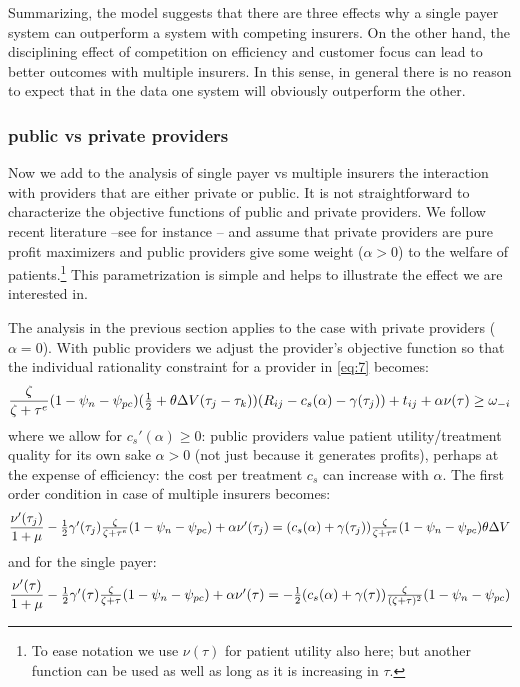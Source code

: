 \documentclass[a4paper,12pt]{article}
\begin{document}
Summarizing, the model suggests that there are three effects why a single payer system can outperform a system with competing insurers. On the other hand, the disciplining effect of competition on efficiency and customer focus can lead to better outcomes with multiple insurers. In this sense, in general there is no reason to expect that in the data one system will obviously outperform the other.

\subsubsection{public vs private providers}
\label{sec:org10bf75f}

Now we add to the analysis of single payer vs multiple insurers the interaction with providers that are either private or public. It is not straightforward to characterize the objective functions of public and private providers. We follow recent literature --see for instance \cite{Brekke2018}-- and assume that private providers are pure profit maximizers and public providers give some weight (\(\alpha > 0\)) to the welfare of patients.\footnote{To ease notation we use \(\nu(\tau)\) for patient utility also here; but another function can be used as well as long as it is increasing in \(\tau\).} This parametrization is simple and helps to illustrate the effect we are interested in.

The analysis in the previous section applies to the case with private providers (\(\alpha=0\)). With public providers we adjust the provider's objective function so that the individual rationality constraint for a provider in \eqref{eq:7} becomes:
\begin{equation}
\label{eq:7a}
\frac{\zeta}{\zeta+\tau^e}(1-\psi_n-\psi_{pc})( \textstyle{1\over 2} + \theta \Delta V (\tau_j - \tau_k))(R_{ij}-c_s(\alpha)-\gamma(\tau_j) ) + t_{ij} + \alpha \nu(\tau) \geq \omega_{-i}
\end{equation}
where we allow for \(c_s'(\alpha) \geq 0\): public providers value patient utility/treatment quality for its own sake \(\alpha>0\) (not just because it generates profits), perhaps at the expense of efficiency: the cost per treatment \(c_s\) can increase with \(\alpha\). The first order condition in case of multiple insurers becomes:
\begin{equation}
\label{eq:37public} 
\frac{\nu'(\tau_j)}{1+\mu} - \textstyle{1\over 2} \gamma'(\tau_j) \frac{\zeta}{\zeta+\tau^e}(1-\psi_n-\psi_{pc}) + \alpha \nu'(\tau_j) = (c_s(\alpha)+\gamma(\tau_j)) \frac{\zeta}{\zeta+\tau^e} (1-\psi_n -\psi_{pc})\theta \Delta V
\end{equation}
and for the single payer:
\begin{equation}
\label{eq:37SPpublic}
 \frac{\nu'(\tau)}{1+\mu} - \textstyle{1\over 2} \gamma'(\tau) \frac{\zeta}{\zeta+\tau}(1-\psi_n-\psi_{pc}) + \alpha \nu'(\tau) = - \textstyle{1\over 2}(c_s(\alpha)+\gamma( \tau)) \frac{\zeta}{(\zeta+\tau)^2} (1-\psi_n -\psi_{pc})
\end{equation}
\end{document}
